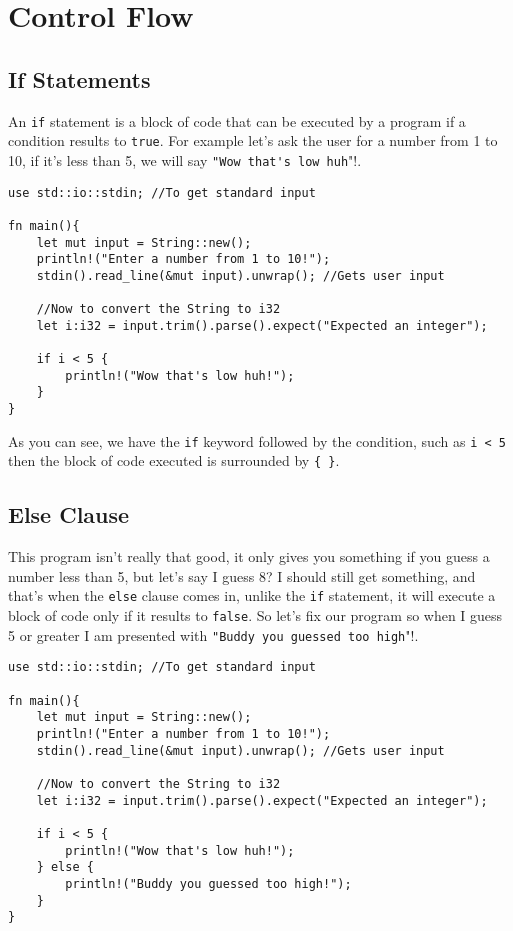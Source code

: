 \chapter{Control Flow}

\section{If Statements}
An \verb!if! statement is a block of code that can be executed by a program if 
a condition results to \verb!true!. For example let's ask the user for a number 
from 1 to 10, if it's less than 5, we will say \verb!"Wow that's low huh!"!. 


\begin{lstlisting}
use std::io::stdin; //To get standard input 

fn main(){
    let mut input = String::new();
    println!("Enter a number from 1 to 10!");
    stdin().read_line(&mut input).unwrap(); //Gets user input 

    //Now to convert the String to i32
    let i:i32 = input.trim().parse().expect("Expected an integer");

    if i < 5 {
        println!("Wow that's low huh!");
    }
}    
\end{lstlisting}

\begin{remark}
    \par As you can see, we have the \verb!if! keyword followed by the condition, such as \verb!i < 5! 
    then the block of code executed is surrounded by \verb!{ }!. 
\end{remark}

\section{Else Clause}
\par This program isn't really that good, it only gives you something if you guess a number less than 5, but let's say I guess 8? I should still get something, and that's when the \verb!else! clause comes in, unlike the \verb!if! statement, it will execute a block of code 
only if it results to \verb!false!. So let's fix our program so when I guess 5 or greater I am presented with \verb!"Buddy you guessed too high!"!. 

\begin{lstlisting}
use std::io::stdin; //To get standard input 

fn main(){
    let mut input = String::new();
    println!("Enter a number from 1 to 10!");
    stdin().read_line(&mut input).unwrap(); //Gets user input 

    //Now to convert the String to i32
    let i:i32 = input.trim().parse().expect("Expected an integer");

    if i < 5 {
        println!("Wow that's low huh!");
    } else {
        println!("Buddy you guessed too high!");
    }
}    
\end{lstlisting}

